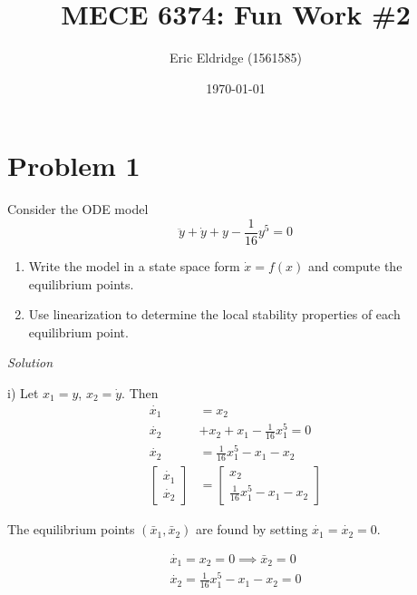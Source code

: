 \documentclass{article}
\title{MECE 6374: Fun Work \#2}
\date{\today}
\author{Eric Eldridge (1561585)}
\begin{document}
  \maketitle

  \section{Problem 1}
  Consider the ODE model
  \begin{equation*}
    \ddot{y}+\dot{y}+y-\frac{1}{16}y^5 = 0 \tag{1.1}
  \end{equation*}
  
  \begin{enumerate}[label=(\roman*)]
    \item Write the model in a state space form $\dot{x}=f(x)$ and compute the
      equilibrium points.
    \item Use linearization to determine the local stability properties of
        each equilibrium point.
  \end{enumerate}
      
  \noindent \textit{Solution} \newline

  i\big) Let $x_1=y$, $x_2=\dot{y}$. Then 
  \begin{align*}
    \dot{x_1} &= x_2 \tag{1.2} \\
    \dot{x_2} &+ x_2 + x_1 -\frac{1}{16}x_1^5 = 0 \\
    \dot{x_2} &= \frac{1}{16}x_1^5 - x_1 - x_2 \tag{1.3} \\
    \begin{bmatrix}
      \dot{x_1} \\
      \dot{x_2}
    \end{bmatrix} &=
    \begin{bmatrix}
      x_2 \\
      \frac{1}{16}x_1^5 - x_1 - x_2
    \end{bmatrix} 
  \end{align*} \newline

  The equilibrium points $(\bar{x}_1, \bar{x}_2)$ are found by setting $\dot{x_1}=\dot{x_2}=0$.

  \begin{align*}
    \dot{x_1} = x_2 = 0 \implies \bar{x}_2=0 \tag{1.4} \\
    \dot{x_2} = \frac{1}{16}x_1^5 - x_1 - x_2 = 0 \tag{1.5} \\
  \end{align*}
\end{document}
